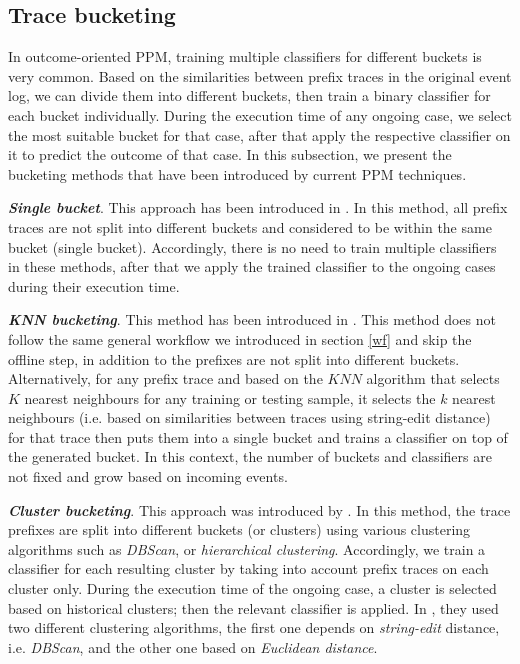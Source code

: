 \subsection{Trace bucketing}
In outcome-oriented PPM, training multiple classifiers for different buckets is very common. Based on the similarities between prefix traces in the original event log, we can divide them into different buckets, then train a binary classifier for each bucket individually. During the execution time of any ongoing case, we select the most suitable bucket for that case, after that apply the respective classifier on it to predict the outcome of that case.  In this subsection,  we present the bucketing methods that have been introduced by current PPM techniques.

\textbf{\textit{Single bucket}}.  This approach has been introduced in \cite{de2016general}. In this method, all prefix traces are not split into different buckets and considered to be within the same bucket (single bucket). Accordingly, there is no need to train multiple classifiers in these methods, after that we apply the trained classifier to the ongoing cases during their execution time.  

\textbf{\textit{KNN bucketing}}. This method has been introduced in \cite{maggi2014predictive}. This method does not follow the same general workflow we introduced in section \ref{wf} and skip the offline step, in addition to the prefixes are not split into different buckets.  Alternatively, for any prefix trace and based on the $KNN$ algorithm that selects $K$ nearest neighbours for any training or testing sample, it selects the $k$ nearest neighbours (i.e. based on similarities between traces using string-edit distance) for that trace then puts them into a single bucket and trains a classifier on top of the generated bucket. In this context, the number of buckets and classifiers are not fixed and grow based on incoming events.

\textbf{\textit{Cluster bucketing}}.  This approach was introduced by \cite{di2017clustering}. In this method, the trace prefixes are split into different buckets (or clusters) using various clustering algorithms such as \textit{DBScan}, or \textit{hierarchical clustering}. Accordingly, we train a classifier for each resulting cluster by taking into account prefix traces on each cluster only. During the execution time of the ongoing case, a cluster is selected based on historical clusters; then the relevant classifier is applied. In \cite{di2017clustering}, they used two different clustering algorithms, the first one depends on \textit{string-edit} distance, i.e. \textit{DBScan}, and the other one based on \textit{Euclidean distance}.



